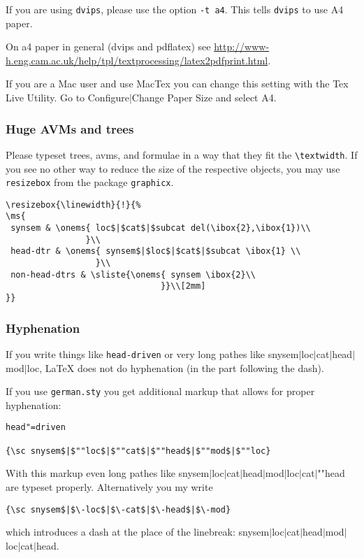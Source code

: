 \documentclass[11pt,a4paper,fleqn]{article}
\begin{document}
If you are using \verb+dvips+, please use the option \verb+-t a4+. This tells
\verb+dvips+ to use A4 paper.

On a4 paper in general (dvips and pdflatex) see \url{http://www-h.eng.cam.ac.uk/help/tpl/textprocessing/latex2pdfprint.html}.

If you are a Mac user and use MacTex you can change this setting with the Tex Live Utility. Go to
Configure$|$Change Paper Size and select A4.

\subsubsection{Huge AVMs and trees}
\label{huge}

Please typeset trees, avms, and formulae in a way that they fit the
\verb+\textwidth+. If you see no other way to reduce the size of the respective
objects, you may use \verb+resizebox+ from the package \verb+graphicx+.
{\small
\begin{verbatim}
\resizebox{\linewidth}{!}{%
\ms{
 synsem & \onems{ loc$|$cat$|$subcat del(\ibox{2},\ibox{1})\\
                }\\
 head-dtr & \onems{ synsem$|$loc$|$cat$|$subcat \ibox{1} \\
                  }\\
 non-head-dtrs & \sliste{\onems{ synsem \ibox{2}\\ 
                               }}\\[2mm]
}}
\end{verbatim}
}


\subsubsection{Hyphenation}
\label{hyphenation}

If you write things like \verb+head-driven+ or very long pathes like
{\sc snysem$|$loc$|$cat$|$head$|$mod$|$loc}, \LaTeX{} does not do hyphenation
(in the part following the dash).

If you use \verb+german.sty+ you get additional markup that allows for proper hyphenation:
\begin{verbatim}
head"=driven

{\sc snysem$|$""loc$|$""cat$|$""head$|$""mod$|$""loc}
\end{verbatim}
With this markup even long pathes like {\sc snysem$|$loc$|$cat$|$head$|$mod$|$loc$|$cat$|$""head}
are typeset properly. Alternatively you my write
\begin{verbatim}
{\sc snysem$|$\-loc$|$\-cat$|$\-head$|$\-mod}
\end{verbatim}
which introduces a dash at the place of the linebreak:
{\sc snysem$|$\-loc$|$\-cat$|$\-head$|$\-mod$|$\-loc$|$\-cat$|$\-head}.
\end{document}
